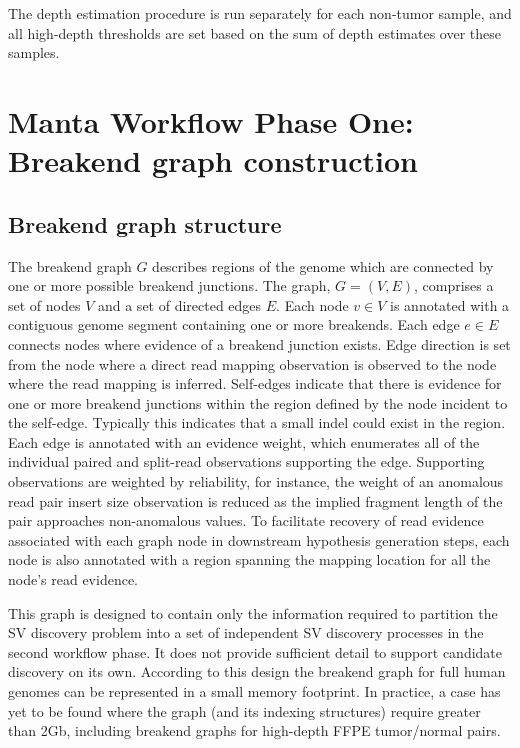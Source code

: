 \documentclass{article}
\begin{document}
The depth estimation procedure is run separately for each non-tumor sample, and all high-depth thresholds are set based on the sum of depth estimates over these samples.

\section{Manta Workflow Phase One: Breakend graph construction}

\subsection{Breakend graph structure}

The breakend graph $G$ describes regions of the genome which are connected by one or more possible breakend junctions. The graph, $G = (V, E)$, comprises a set of nodes $V$ and a set of directed edges $E$. Each node $v \in V$ is annotated with a contiguous genome segment containing one or more breakends. Each edge $e \in E$ connects nodes where evidence of a breakend junction exists. Edge direction is set from the node where a direct read mapping observation is observed to the node where the read mapping is inferred. Self-edges indicate that there is evidence for one or more breakend junctions within the region defined by the node incident to the self-edge. Typically this indicates that a small indel could exist in the region. Each edge is annotated with an evidence weight, which enumerates all of the individual paired and split-read observations supporting the edge. Supporting observations are weighted by reliability, for instance, the weight of an anomalous read pair insert size observation is reduced as the implied fragment length of the pair approaches non-anomalous values. To facilitate recovery of read evidence associated with each graph node in downstream hypothesis generation steps, each node is also annotated with a region spanning the mapping location for all the node's read evidence.

This graph is designed to contain only the information required to partition the SV discovery problem into a set of independent SV discovery processes in the second workflow phase. It does not provide sufficient detail to support candidate discovery on its own. According to this design the breakend graph for full human genomes can be represented in a small memory footprint. In practice, a case has yet to be found where the graph (and its indexing structures) require greater than 2Gb, including breakend graphs for high-depth FFPE tumor/normal pairs.
\end{document}
